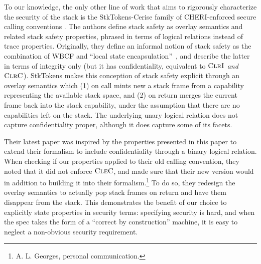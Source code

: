 \documentclass[10pt,conference]{ieeetran}%
\theoremstyle{definition}
\begin{document}
To our knowledge, the only other line of work that aims to rigorously characterize the
security of the stack is the StkTokens-Cerise family of CHERI-enforced secure calling
conventions \cite{SkorstengaardLocal, SkorstengaardSTKJFP, Georges22:TempsDesCerises}.
%
The authors define stack safety as overlay semantics and related stack
safety properties, phrased in terms of logical relations instead of trace
properties.
%
Originally, they define an informal notion of stack safety as the combination of WBCF
and ``local state encapsulation''~\cite{SkorstengaardSTKJFP},
and describe the latter
in terms of integrity only (but it has confidentiality, equivalent
to \(\textnormal{\sc ClrI}\) {\em and} \(\textnormal{\sc ClrC}\)).
%
StkTokens \cite{SkorstengaardSTKJFP} makes this conception of stack safety
explicit through an overlay semantics
which (1) on call mints new a stack frame from a capability representing the
available stack space, and (2) on return merges the current frame back into the
stack capability, under the assumption that there are no capabilities left on
the stack.
%
The underlying unary logical relation does not capture confidentiality proper,
although it does capture some of its facets.

Their latest
paper \cite{Georges22:TempsDesCerises} was inspired by the properties presented
in this paper to extend their formalism to include confidentiality through a binary logical relation. When
checking if our properties applied to their old calling convention, they noted that
it did not enforce \(\textnormal{\sc CleC}\), and made sure that their new version
would in addition to building it into their formalism.\footnote{A. L. Georges,
personal communication.}
%
To do so, they redesign the overlay semantics to actually pop stack frames on
return and have them disappear from the stack.
%
This demonstrates the benefit of our
choice to explicitly state properties in security terms: specifying security
is hard, and when the spec takes the form of a ``correct by
construction'' machine, it is easy to neglect a non-obvious security
requirement.
\end{document}
